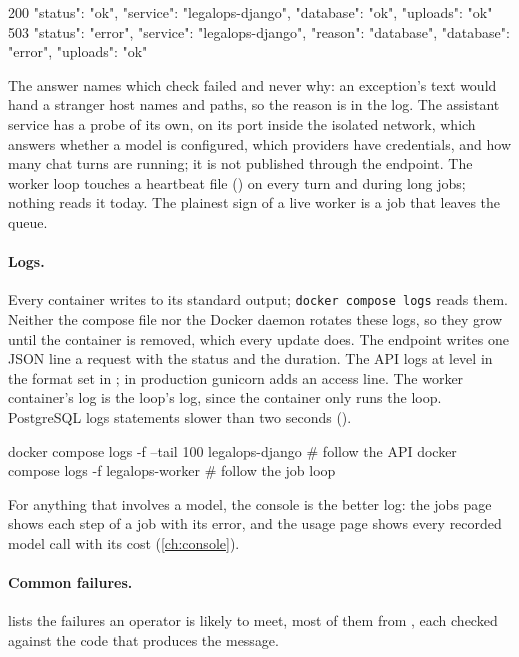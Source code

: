\begin{codeblock}
200  {"status": "ok", "service": "legalops-django", "database": "ok", "uploads": "ok"}
503  {"status": "error", "service": "legalops-django", "reason": "database",
      "database": "error", "uploads": "ok"}
\end{codeblock}

The answer names which check failed and never why: an exception's text would hand a stranger
host names and paths, so the reason is in the log. The assistant service has a probe of its
own,  on its port inside the isolated network, which answers whether a model is
configured, which providers have credentials, and how many chat turns are running; it is not
published through the endpoint. The worker loop touches a heartbeat file
() on every turn and during long jobs; nothing reads it today.
The plainest sign of a live worker is a job that leaves the queue.

\paragraph{Logs.} Every container writes to its standard output; \texttt{docker compose logs}
reads them. Neither the compose file nor the Docker daemon rotates these logs, so they grow
until the container is removed, which every update does. The endpoint writes one JSON line a
request with the status and the duration. The API logs at level  in the format set
in ; in production gunicorn adds an access line. The worker container's
log is the loop's log, since the container only runs the loop. PostgreSQL logs statements
slower than two seconds ().

\begin{codeblock}
docker compose logs -f --tail 100 legalops-django     # follow the API
docker compose logs -f legalops-worker                # follow the job loop
\end{codeblock}

For anything that involves a model, the console is the better log: the jobs page shows each
step of a job with its error, and the usage page shows every recorded model call with its
cost (\cref{ch:console}).

\paragraph{Common failures.}  lists the failures an operator is likely
to meet, most of them from , each checked against the code that
produces the message.

